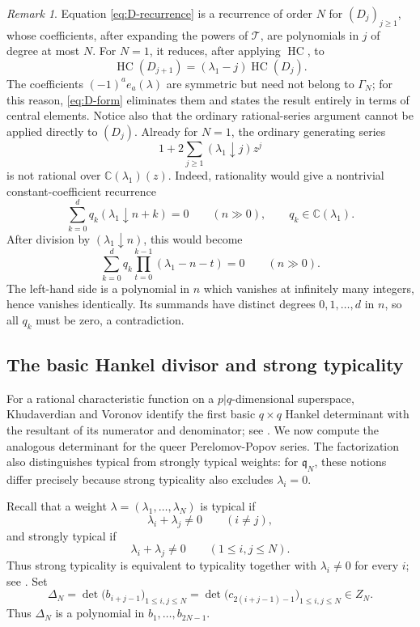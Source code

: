 \documentclass[11pt]{amsart}
\numberwithin{equation}{section}
\theoremstyle{definition}
\theoremstyle{remark}
\newtheorem{remark}[theorem]{Remark}
\newcommand{\C}{\mathbb C}
\newcommand{\q}{\mathfrak q}
\newcommand{\HC}{\operatorname{HC}}
\newcommand{\fall}[2]{(#1\mathbin{\downarrow}#2)}
\begin{document}
\begin{remark}
Equation \eqref{eq:D-recurrence} is a recurrence of order \(N\) for
\((D_j)_{j\geq1}\), whose coefficients, after expanding the powers of
\(\mathcal T\), are polynomials in \(j\) of degree at most \(N\).  For
\(N=1\), it reduces, after applying \(\HC\), to
\[
 \HC(D_{j+1})=(\lambda_1-j)\HC(D_j).
\]
The coefficients
\((-1)^ae_a(\lambda)\) are symmetric but need not belong to
\(\Gamma_N\); for this reason, \eqref{eq:D-form} eliminates them and
states the result entirely in terms of central elements.  Notice also
that the ordinary rational-series argument cannot be applied directly
to \((D_j)\).  Already for \(N=1\), the ordinary generating series
\[
 1+2\sum_{j\geq1}\fall{\lambda_1}{j}z^j
\]
is not rational over \(\C(\lambda_1)(z)\).  Indeed, rationality would
give a nontrivial constant-coefficient recurrence
\[
 \sum_{k=0}^dq_k\fall{\lambda_1}{n+k}=0
 \qquad(n\gg0),
 \qquad q_k\in\C(\lambda_1).
\]
After division by \(\fall{\lambda_1}{n}\), this would become
\[
 \sum_{k=0}^dq_k
 \prod_{t=0}^{k-1}(\lambda_1-n-t)=0
 \qquad(n\gg0).
\]
The left-hand side is a polynomial in \(n\) which vanishes at
infinitely many integers, hence vanishes identically.  Its summands have
distinct degrees \(0,1,\ldots,d\) in \(n\), so all \(q_k\) must be zero,
a contradiction.
\end{remark}

\subsection{The basic Hankel divisor and strong typicality}

For a rational characteristic function on a \(p|q\)-dimensional
superspace, Khudaverdian and Voronov identify the first basic
\(q\times q\) Hankel determinant with the resultant of its numerator
and denominator; see \cite[Prop.~3, Eq.~(5.6)]{KV2005}.  We now compute
the analogous determinant for the queer Perelomov-Popov series.  The
factorization also distinguishes typical from strongly typical weights:
for \(\q_N\), these notions differ precisely because strong typicality
also excludes \(\lambda_i=0\).

Recall that a weight
\(\lambda=(\lambda_1,\ldots,\lambda_N)\) is typical if
\[
 \lambda_i+\lambda_j\neq0
 \qquad(i\neq j),
\]
and strongly typical if
\[
 \lambda_i+\lambda_j\neq0
 \qquad(1\leq i,j\leq N).
\]
Thus strong typicality is equivalent to typicality together with
\(\lambda_i\neq0\) for every \(i\); see
\cite[Section~2]{FriskMazorchuk2009}.
Set
\begin{equation}
 \Delta_N
 =\det\bigl(b_{i+j-1}\bigr)_{1\leq i,j\leq N}
 =\det\bigl(c_{2(i+j-1)-1}\bigr)_{1\leq i,j\leq N}
 \in Z_N.
 \label{eq:Hankel-Delta}
\end{equation}
Thus \(\Delta_N\) is a polynomial in
\(b_1,\ldots,b_{2N-1}\).
\end{document}
